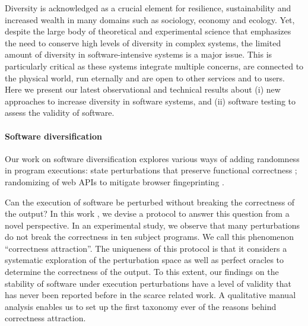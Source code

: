 Diversity is acknowledged as a crucial element for resilience, sustainability and increased wealth in many domains such as  sociology, economy and ecology. 
Yet, despite the large body of theoretical and experimental science that emphasizes the need to conserve high levels of diversity in complex systems, the limited amount of diversity in software-intensive systems is a major issue. 
This  is particularly critical as these systems integrate multiple concerns, are connected to the physical world, run eternally and are open to other services and to users.
Here we present our latest observational and technical results about (i) new approaches to increase diversity in software systems, and (ii) software testing to assess the validity of software. 

\paragraph{Software diversification}  

Our work on software diversification explores various ways of adding randomness in program executions: state perturbations that preserve functional correctness \cite{danglot:hal-01378523}; randomizing of web APIs to mitigate browser fingeprinting \cite{laperdrix:hal-01527580}. 

Can the execution of software be perturbed without breaking the correctness of the output?
In this work \cite{danglot:hal-01378523}, we devise a protocol to answer this question from a novel perspective.
In an experimental study, we observe that many perturbations do not break the correctness in ten subject programs. 
We call this phenomenon ``correctness attraction''.
The uniqueness of this protocol is that it considers a systematic exploration of the perturbation space as well as perfect oracles to determine the correctness of the output. 
To this extent, our findings on the stability of software under execution perturbations have a level of validity that has never been reported before in the scarce related work.
A qualitative manual analysis enables us to set up the first taxonomy ever of the reasons behind correctness attraction.

